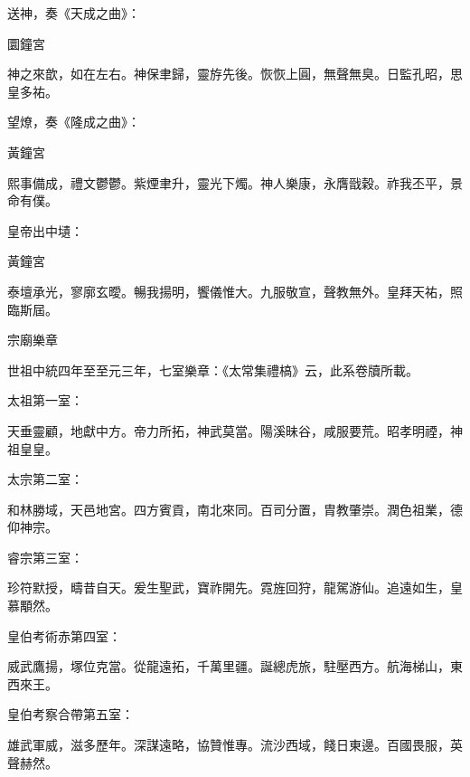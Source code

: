 \begin{pinyinscope}
 送神，奏《天成之曲》：



 圜鐘宮



 神之來歆，如在左右。神保聿歸，靈斿先後。恢恢上圓，無聲無臭。日監孔昭，思皇多祐。



 望燎，奏《隆成之曲》：



 黃鐘宮



 熙事備成，禮文鬱鬱。紫煙聿升，靈光下燭。神人樂康，永膺戩穀。祚我丕平，景命有僕。



 皇帝出中壝：



 黃鐘宮



 泰壇承光，寥廓玄曖。暢我揚明，饗儀惟大。九服敬宣，聲教無外。皇拜天祐，照臨斯屆。



 宗廟樂章



 世祖中統四年至至元三年，七室樂章：《太常集禮槁》云，此系卷牘所載。



 太祖第一室：



 天垂靈顧，地獻中方。帝力所拓，神武莫當。陽溪昧谷，咸服要荒。昭孝明禋，神祖皇皇。



 太宗第二室：



 和林勝域，天邑地宮。四方賓貢，南北來同。百司分置，胄教肇崇。潤色祖業，德仰神宗。



 睿宗第三室：



 珍符默授，疇昔自天。爰生聖武，寶祚開先。霓旌回狩，龍駕游仙。追遠如生，皇慕顒然。



 皇伯考術赤第四室：



 威武鷹揚，塚位克當。從龍遠拓，千萬里疆。誕總虎旅，駐壓西方。航海梯山，東西來王。



 皇伯考察合帶第五室：



 雄武軍威，滋多歷年。深謀遠略，協贊惟專。流沙西域，餞日東邊。百國畏服，英聲赫然。




\end{pinyinscope}
